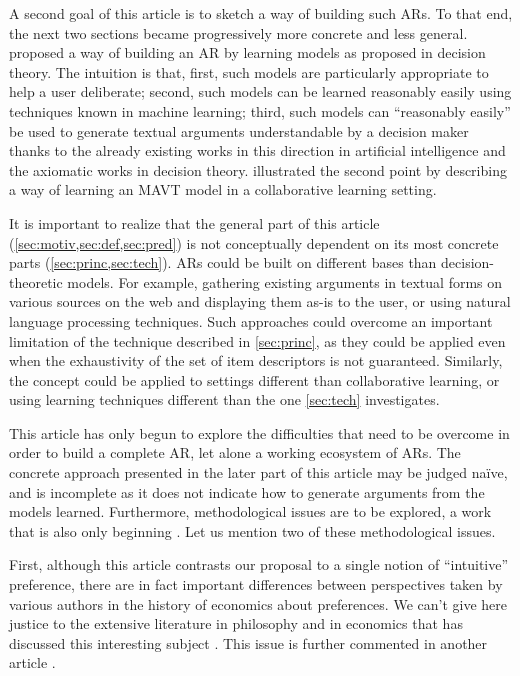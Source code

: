 \documentclass[version=3.21, pagesize, twoside=off, bibliography=totoc, DIV=calc, fontsize=12pt, a4paper, french, english]{scrartcl}
\begin{document}
A second goal of this article is to sketch a way of building such \acp{AR}. To that end, the next two sections became progressively more concrete and less general.  proposed a way of building an \ac{AR} by learning models as proposed in decision theory. The intuition is that, first, such models are particularly appropriate to help a user deliberate; second, such models can be learned reasonably easily using techniques known in machine learning; third, such models can “reasonably easily” be used to generate textual arguments understandable by a decision maker thanks to the already existing works in this direction in artificial intelligence and the axiomatic works in decision theory.  illustrated the second point by describing a way of learning an \ac{MAVT} model in a collaborative learning setting.

It is important to realize that the general part of this article (\cref{sec:motiv,sec:def,sec:pred}) is not conceptually dependent on its most concrete parts (\cref{sec:princ,sec:tech}). \Acp{AR} could be built on different bases than decision-theoretic models. For example, gathering existing arguments in textual forms on various sources on the web and displaying them as-is to the user, or using natural language processing techniques. 
Such approaches could overcome an important limitation of the technique described in \cref{sec:princ}, as they could be applied even when the exhaustivity of the set of item descriptors is not guaranteed.
Similarly, the concept could be applied to settings different than collaborative learning, or using learning techniques different than the one \cref{sec:tech} investigates.

This article has only begun to explore the difficulties that need to be overcome in order to build a complete \ac{AR}, let alone a working ecosystem of \acp{AR}. The concrete approach presented in the later part of this article may be judged naïve, and is incomplete as it does not indicate how to generate arguments from the models learned. 
Furthermore, methodological issues are to be explored, a work that is also only beginning \citep{cailloux_formal_2018}. Let us mention two of these methodological issues.

First,
although this article contrasts our proposal to a single notion of “intuitive” preference, there are in fact important differences between perspectives taken by various authors in the history of economics about preferences. We can’t give here justice to the extensive literature in philosophy and in economics that has discussed this interesting subject \citep{bruni_vilfredo_2001}. This issue is further commented in another article \citep{meinard_justification_2018}.
\end{document}
